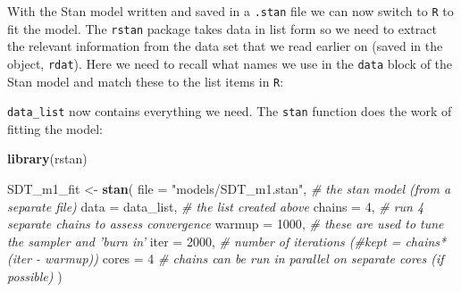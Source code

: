\documentclass[
  english,
  ,man,floatsintext]{apa6}
\newenvironment{Shaded}{\begin{snugshade}}{\end{snugshade}}
\newcommand{\CommentTok}[1]{\textcolor[rgb]{0.56,0.35,0.01}{\textit{#1}}}
\newcommand{\DataTypeTok}[1]{\textcolor[rgb]{0.13,0.29,0.53}{#1}}
\newcommand{\DecValTok}[1]{\textcolor[rgb]{0.00,0.00,0.81}{#1}}
\newcommand{\KeywordTok}[1]{\textcolor[rgb]{0.13,0.29,0.53}{\textbf{#1}}}
\newcommand{\NormalTok}[1]{#1}
\newcommand{\OperatorTok}[1]{\textcolor[rgb]{0.81,0.36,0.00}{\textbf{#1}}}
\newcommand{\StringTok}[1]{\textcolor[rgb]{0.31,0.60,0.02}{#1}}
\begin{document}
With the Stan model written and saved in a \texttt{.stan} file we can now switch to \texttt{R} to fit the model. The \texttt{rstan} package takes data in list form so we need to extract the relevant information from the data set that we read earlier on (saved in the object, \texttt{rdat}). Here we need to recall what names we use in the \texttt{data} block of the Stan model and match these to the list items in \texttt{R}:

\begin{Shaded}
\end{Shaded}

\texttt{data\_list} now contains everything we need. The \texttt{stan} function does the work of fitting the model:

\begin{Shaded}
\begin{Highlighting}[]
\KeywordTok{library}\NormalTok{(rstan)}

\NormalTok{SDT_m1_fit <-}\StringTok{ }\KeywordTok{stan}\NormalTok{(}
  \DataTypeTok{file =} \StringTok{"models/SDT_m1.stan"}\NormalTok{, }\CommentTok{# the stan model (from a separate file)}
  \DataTypeTok{data =}\NormalTok{ data_list, }\CommentTok{# the list created above}
  \DataTypeTok{chains =} \DecValTok{4}\NormalTok{, }\CommentTok{# run 4 separate chains to assess convergence}
  \DataTypeTok{warmup =} \DecValTok{1000}\NormalTok{, }\CommentTok{# these are used to tune the sampler and 'burn in'}
  \DataTypeTok{iter =} \DecValTok{2000}\NormalTok{, }\CommentTok{# number of iterations (#kept = chains*(iter - warmup))}
  \DataTypeTok{cores =} \DecValTok{4} \CommentTok{# chains can be run in parallel on separate cores (if possible)}
\NormalTok{)}
\end{Highlighting}
\end{Shaded}
\end{document}
